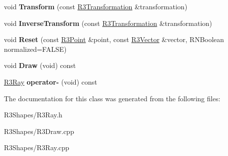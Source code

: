 \begin{DoxyCompactItemize}
\item 
void {\bfseries Transform} (const \hyperlink{class_r3_transformation}{R3\+Transformation} \&transformation)\hypertarget{class_r3_ray_ab7cfd9b6541d2e26b4d89ea86aa8b0a7}{}\label{class_r3_ray_ab7cfd9b6541d2e26b4d89ea86aa8b0a7}

\item 
void {\bfseries Inverse\+Transform} (const \hyperlink{class_r3_transformation}{R3\+Transformation} \&transformation)\hypertarget{class_r3_ray_a2ade16b546fcf6c8834f7ab125749ea4}{}\label{class_r3_ray_a2ade16b546fcf6c8834f7ab125749ea4}

\item 
void {\bfseries Reset} (const \hyperlink{class_r3_point}{R3\+Point} \&point, const \hyperlink{class_r3_vector}{R3\+Vector} \&vector, R\+N\+Boolean normalized=F\+A\+L\+SE)\hypertarget{class_r3_ray_a28284835380327496439de0efb00e36b}{}\label{class_r3_ray_a28284835380327496439de0efb00e36b}

\item 
void {\bfseries Draw} (void) const \hypertarget{class_r3_ray_a0113a20ae87eb8edd766a7f55d965b4a}{}\label{class_r3_ray_a0113a20ae87eb8edd766a7f55d965b4a}

\item 
\hyperlink{class_r3_ray}{R3\+Ray} {\bfseries operator-\/} (void) const \hypertarget{class_r3_ray_a8f7c42571ddab5e4a4a9495ce0fdc136}{}\label{class_r3_ray_a8f7c42571ddab5e4a4a9495ce0fdc136}

\end{DoxyCompactItemize}


The documentation for this class was generated from the following files\+:\begin{DoxyCompactItemize}
\item 
R3\+Shapes/R3\+Ray.\+h\item 
R3\+Shapes/R3\+Draw.\+cpp\item 
R3\+Shapes/R3\+Ray.\+cpp\end{DoxyCompactItemize}
